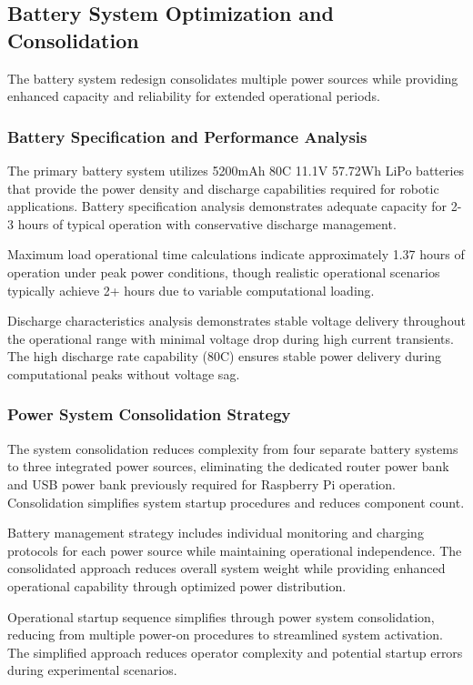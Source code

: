 \subsection{Battery System Optimization and Consolidation}

The battery system redesign consolidates multiple power sources while providing enhanced capacity and reliability for extended operational periods.

\subsubsection{Battery Specification and Performance Analysis}

The primary battery system utilizes 5200mAh 80C 11.1V 57.72Wh LiPo batteries that provide the power density and discharge capabilities required for robotic applications. Battery specification analysis demonstrates adequate capacity for 2-3 hours of typical operation with conservative discharge management.

Maximum load operational time calculations indicate approximately 1.37 hours of operation under peak power conditions, though realistic operational scenarios typically achieve 2+ hours due to variable computational loading.

Discharge characteristics analysis demonstrates stable voltage delivery throughout the operational range with minimal voltage drop during high current transients. The high discharge rate capability (80C) ensures stable power delivery during computational peaks without voltage sag.

\subsubsection{Power System Consolidation Strategy}

The system consolidation reduces complexity from four separate battery systems to three integrated power sources, eliminating the dedicated router power bank and USB power bank previously required for Raspberry Pi operation. Consolidation simplifies system startup procedures and reduces component count.

Battery management strategy includes individual monitoring and charging protocols for each power source while maintaining operational independence. The consolidated approach reduces overall system weight while providing enhanced operational capability through optimized power distribution.

Operational startup sequence simplifies through power system consolidation, reducing from multiple power-on procedures to streamlined system activation. The simplified approach reduces operator complexity and potential startup errors during experimental scenarios.

